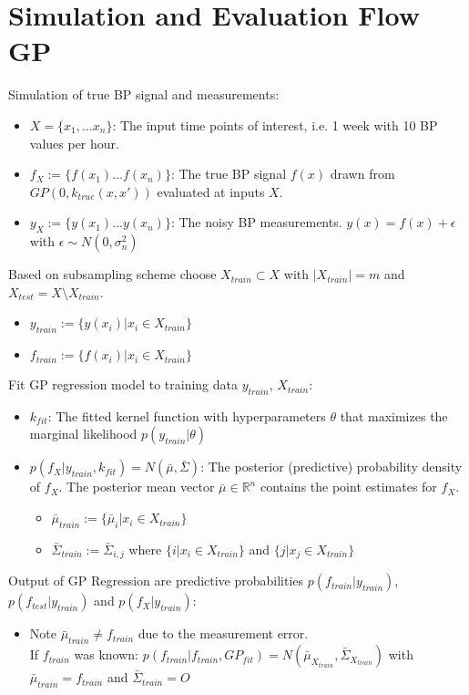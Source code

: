 \section{Simulation and Evaluation Flow GP}

Simulation of true BP signal and measurements:
    \begin{itemize}
        \item $X=\{x_1, \dots x_n\}$: The input time points of interest, i.e. 1 week with 10 BP values per hour.
        \item $f_X := \{f(x_1) \dots f(x_n)\}$: The true BP signal $f(x)$ drawn from $GP(0, k_{true}(x,x'))$ evaluated at inputs $X$.
        \item $y_X := \{y(x_1) \dots y(x_n)\}$: The noisy BP measurements. $y(x)= f(x) + \epsilon$ with $\epsilon \sim N(0, \sigma_n^2)$
    \end{itemize}

Based on subsampling scheme choose $X_{train} \subset X$ with $|X_{train}| = m$ and $X_{test} = X \setminus X_{train}$.
\begin{itemize}
    \item $y_{train} := \{y(x_i) | x_i \in X_{train}\}$
    \item  $f_{train} := \{f(x_i) | x_i \in X_{train}\}$
\end{itemize}


	Fit GP regression model to training data $y_{train}$, $X_{train}$:
    \begin{itemize}
        \item $k_{fit}$: The fitted kernel function with hyperparameters $\theta$ that maximizes the marginal likelihood
        $p(y_{train}| \theta)$
        \item $p(f_X| y_{train}, k_{fit}) = N(\bar{\mu}, \bar{\Sigma})$:
        The posterior (predictive) probability density of $f_X$. The posterior mean vector
        $\bar{\mu} \in \mathbb{R}^n$ contains the point estimates for $f_X$.
        \begin{itemize}
            \item $\bar{\mu}_{train} := \{\bar{\mu}_i | x_i \in X_{train}\}$
            \item $\bar{\Sigma}_{train} := \bar{\Sigma}_{i,j}$ where $\{i | x_i \in X_{train}\}$ and $\{j | x_j \in X_{train}\}$

        \end{itemize}
    \end{itemize}

	Output of GP Regression are predictive probabilities $p(f_{train}| y_{train})$,
		$p(f_{test}| y_{train})$ and $p(f_{X}| y_{train})$:
			\begin{itemize}
				\item Note $\bar{\mu}_{train} \neq f_{train}$ due to the measurement error. \\ If
				$f_{train}$ was known: $p(f_{train}| f_{train}, GP_{fit}) = N(\bar{\mu}_{X_{train}},
				\bar{\Sigma}_{X_{train}})$
				with $\bar{\mu}_{train} = f_{train}$ and $\bar{\Sigma}_{train} = {\displaystyle O}$
			\end{itemize}

